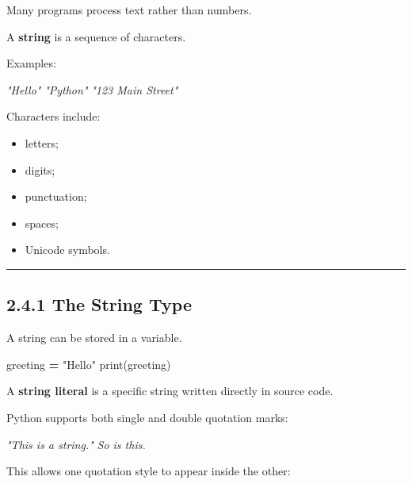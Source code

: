 \documentclass[
]{article}
\newenvironment{Shaded}{\begin{snugshade}}{\end{snugshade}}
\newcommand{\BuiltInTok}[1]{#1}
\newcommand{\CommentTok}[1]{\textcolor[rgb]{0.56,0.35,0.01}{\textit{#1}}}
\newcommand{\NormalTok}[1]{#1}
\newcommand{\OperatorTok}[1]{\textcolor[rgb]{0.81,0.36,0.00}{\textbf{#1}}}
\newcommand{\StringTok}[1]{\textcolor[rgb]{0.31,0.60,0.02}{#1}}
\providecommand{\tightlist}{%
  \setlength{\itemsep}{0pt}\setlength{\parskip}{0pt}}
\begin{document}
Many programs process text rather than numbers.

A \textbf{string} is a sequence of characters.

Examples:

\begin{Shaded}
\begin{Highlighting}[]
\CommentTok{"Hello"}
\CommentTok{"Python"}
\CommentTok{"123 Main Street"}
\end{Highlighting}
\end{Shaded}

Characters include:

\begin{itemize}
\tightlist
\item
  letters;
\item
  digits;
\item
  punctuation;
\item
  spaces;
\item
  Unicode symbols.
\end{itemize}

\begin{center}\rule{0.5\linewidth}{0.5pt}\end{center}

\subsection{2.4.1 The String Type}\label{the-string-type}

A string can be stored in a variable.

\begin{Shaded}
\begin{Highlighting}[]
\NormalTok{greeting }\OperatorTok{=} \StringTok{"Hello"}
\BuiltInTok{print}\NormalTok{(greeting)}
\end{Highlighting}
\end{Shaded}

A \textbf{string literal} is a specific string written directly in
source code.

Python supports both single and double quotation marks:

\begin{Shaded}
\begin{Highlighting}[]
\CommentTok{"This is a string."}
\CommentTok{\textquotesingle{}So is this.\textquotesingle{}}
\end{Highlighting}
\end{Shaded}

This allows one quotation style to appear inside the other:
\end{document}
